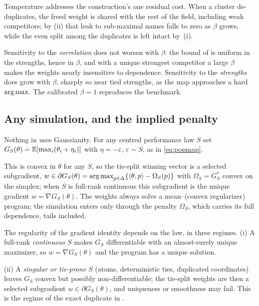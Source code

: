 Temperature addresses the construction's one residual cost.
When a cluster
de-duplicates, the freed weight is shared with the rest of the field, including weak
competitors; by (ii) that leak to sub-maximal names falls to
zero as $\beta$ grows, while the even split among the duplicates is left intact
by~(i).

Sensitivity to the
\emph{correlation} does not worsen with $\beta$: the bound of 
is uniform in the strengths, hence in $\beta$, and with a unique strongest
competitor a large $\beta$ makes the weights nearly insensitive to dependence.
Sensitivity to the \emph{strengths} does grow with $\beta$, sharply so near tied
strengths, as the map approaches a hard $\operatorname*{arg\,max}$.
The calibrated $\beta = 1$
reproduces the benchmark.

\subsection{Any simulation, and the implied penalty}
\label{rem:anysim}

Nothing in  uses Gaussianity.
For any centred performance law
$S$ set $G_S(\theta) = \mathbb{E}[\max_i(\theta_i + \eta_i)]$ with $\eta = -\varepsilon$,
$\varepsilon \sim S$, as in \eqref{eq:popmap}.

This is convex
in $\theta$ for any $S$, so the tie-split winning vector is a selected subgradient,
$w \in \partial G_S(\theta) = \operatorname*{arg\,max}_{p\in\Delta}\{\langle\theta, p\rangle -
\Omega_S(p)\}$ with $\Omega_S = G_S^{*}$ convex on the simplex; when $S$ is full-rank
continuous this subgradient is the unique gradient $w = \nabla G_S(\theta)$.
The
weights always solve a
mean--(convex regularizer) program; the simulation enters only through the penalty
$\Omega_S$, which carries its full dependence, tails included.

The regularity of the gradient identity depends on the law, in three regimes.
(i) A full-rank \emph{continuous} $S$ makes $G_S$ differentiable with an
almost-surely unique maximizer, so $w = \nabla G_S(\theta)$ and the program has a
unique solution.

(ii) A \emph{singular or tie-prone} $S$ (atoms, deterministic ties, duplicated
coordinates) leaves $G_S$ convex but possibly non-differentiable; the tie-split
weights are then a selected subgradient $w\in\partial G_S(\theta)$, and uniqueness
or smoothness may fail. This is the regime of the exact duplicate in
.

